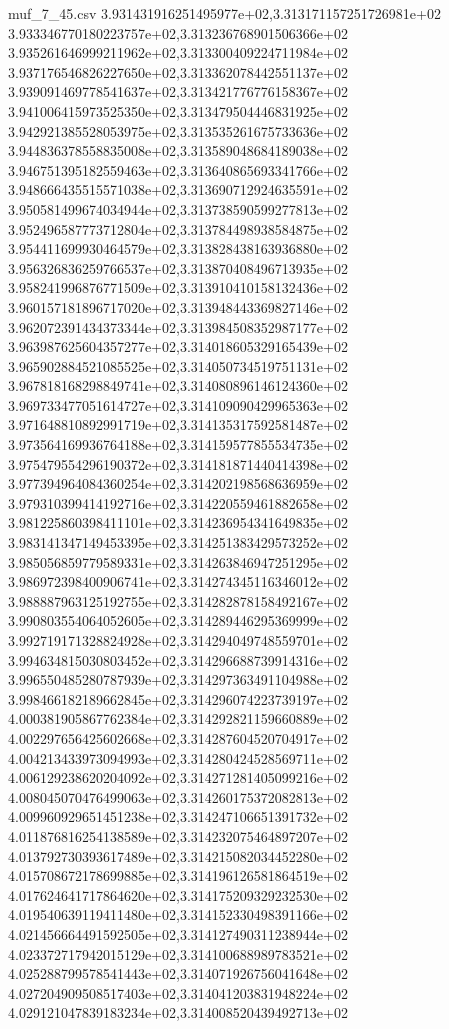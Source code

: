 \begin{filecontents*}{muf_7_45.csv}
3.931431916251495977e+02,3.313171157251726981e+02
3.933346770180223757e+02,3.313236768901506366e+02
3.935261646999211962e+02,3.313300409224711984e+02
3.937176546826227650e+02,3.313362078442551137e+02
3.939091469778541637e+02,3.313421776776158367e+02
3.941006415973525350e+02,3.313479504446831925e+02
3.942921385528053975e+02,3.313535261675733636e+02
3.944836378558835008e+02,3.313589048684189038e+02
3.946751395182559463e+02,3.313640865693341766e+02
3.948666435515571038e+02,3.313690712924635591e+02
3.950581499674034944e+02,3.313738590599277813e+02
3.952496587773712804e+02,3.313784498938584875e+02
3.954411699930464579e+02,3.313828438163936880e+02
3.956326836259766537e+02,3.313870408496713935e+02
3.958241996876771509e+02,3.313910410158132436e+02
3.960157181896717020e+02,3.313948443369827146e+02
3.962072391434373344e+02,3.313984508352987177e+02
3.963987625604357277e+02,3.314018605329165439e+02
3.965902884521085525e+02,3.314050734519751131e+02
3.967818168298849741e+02,3.314080896146124360e+02
3.969733477051614727e+02,3.314109090429965363e+02
3.971648810892991719e+02,3.314135317592581487e+02
3.973564169936764188e+02,3.314159577855534735e+02
3.975479554296190372e+02,3.314181871440414398e+02
3.977394964084360254e+02,3.314202198568636959e+02
3.979310399414192716e+02,3.314220559461882658e+02
3.981225860398411101e+02,3.314236954341649835e+02
3.983141347149453395e+02,3.314251383429573252e+02
3.985056859779589331e+02,3.314263846947251295e+02
3.986972398400906741e+02,3.314274345116346012e+02
3.988887963125192755e+02,3.314282878158492167e+02
3.990803554064052605e+02,3.314289446295369999e+02
3.992719171328824928e+02,3.314294049748559701e+02
3.994634815030803452e+02,3.314296688739914316e+02
3.996550485280787939e+02,3.314297363491104988e+02
3.998466182189662845e+02,3.314296074223739197e+02
4.000381905867762384e+02,3.314292821159660889e+02
4.002297656425602668e+02,3.314287604520704917e+02
4.004213433973094993e+02,3.314280424528569711e+02
4.006129238620204092e+02,3.314271281405099216e+02
4.008045070476499063e+02,3.314260175372082813e+02
4.009960929651451238e+02,3.314247106651391732e+02
4.011876816254138589e+02,3.314232075464897207e+02
4.013792730393617489e+02,3.314215082034452280e+02
4.015708672178699885e+02,3.314196126581864519e+02
4.017624641717864620e+02,3.314175209329232530e+02
4.019540639119411480e+02,3.314152330498391166e+02
4.021456664491592505e+02,3.314127490311238944e+02
4.023372717942015129e+02,3.314100688989783521e+02
4.025288799578541443e+02,3.314071926756041648e+02
4.027204909508517403e+02,3.314041203831948224e+02
4.029121047839183234e+02,3.314008520439492713e+02

\end{filecontents*}
